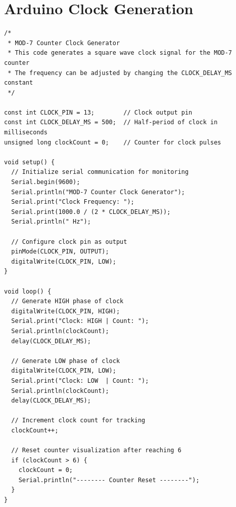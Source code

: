 \documentclass{article}
\begin{document}
\section{Arduino Clock Generation}
\begin{tcolorbox}[colback=boxbg,colframe=titlebg,title=Arduino Clock Generation Code,breakable]
\lstset{style=arduino}
\begin{lstlisting}
/*
 * MOD-7 Counter Clock Generator
 * This code generates a square wave clock signal for the MOD-7 counter
 * The frequency can be adjusted by changing the CLOCK_DELAY_MS constant
 */

const int CLOCK_PIN = 13;        // Clock output pin
const int CLOCK_DELAY_MS = 500;  // Half-period of clock in milliseconds
unsigned long clockCount = 0;    // Counter for clock pulses

void setup() {
  // Initialize serial communication for monitoring
  Serial.begin(9600);
  Serial.println("MOD-7 Counter Clock Generator");
  Serial.print("Clock Frequency: ");
  Serial.print(1000.0 / (2 * CLOCK_DELAY_MS));
  Serial.println(" Hz");
  
  // Configure clock pin as output
  pinMode(CLOCK_PIN, OUTPUT);
  digitalWrite(CLOCK_PIN, LOW);
}

void loop() {
  // Generate HIGH phase of clock
  digitalWrite(CLOCK_PIN, HIGH);
  Serial.print("Clock: HIGH | Count: ");
  Serial.println(clockCount);
  delay(CLOCK_DELAY_MS);
  
  // Generate LOW phase of clock
  digitalWrite(CLOCK_PIN, LOW);
  Serial.print("Clock: LOW  | Count: ");
  Serial.println(clockCount);
  delay(CLOCK_DELAY_MS);
  
  // Increment clock count for tracking
  clockCount++;
  
  // Reset counter visualization after reaching 6
  if (clockCount > 6) {
    clockCount = 0;
    Serial.println("-------- Counter Reset --------");
  }
}
\end{lstlisting}
\end{tcolorbox}
\end{document}

